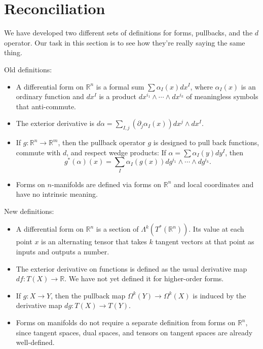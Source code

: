 \documentclass[12pt]{amsbook}
\newcommand{\R}{{\mathbb R}}
\theoremstyle{definition}
\begin{document}
\section{Reconciliation}

We have developed two different sets of definitions for forms, pullbacks,
and the $d$ operator. Our task in this section is to see how they're really
saying the same thing. 

\bigskip

\centerline{Old definitions:}

\smallskip

\begin{itemize}
\item A differential form on $\R^n$ is a formal sum $\sum \alpha_I(x) dx^I$,
where $\alpha_I(x)$ is an ordinary function and $dx^I$ is a product
$dx^{i_1}\wedge \cdots\wedge dx^{i_k}$ of meaningless symbols that
anti-commute.
\item The exterior derivative is 
$d\alpha = \sum_{I,j} (\partial_j \alpha_I(x)) dx^j \wedge dx^I$.
\item If $g: \R^n \to \R^m$, then the pullback operator $g$ is designed
to pull back functions, commute with $d$, and respect wedge products:
If $\alpha = \sum \alpha_I(y) dy^I$, then 
$$ g^*(\alpha)(x) = \sum_I \alpha_I(g(x)) dg^{i_1}\wedge\cdots\wedge dg^{i_k}.
$$
\item Forms on $n$-manifolds are defined via forms on $\R^n$ and local
coordinates and have no intrinsic meaning. 
\end{itemize}

\bigskip

\centerline{New definitions:}

\smallskip

\begin{itemize}
\item A differential form on $\R^n$ is a section of $\Lambda^k(T^*(\R^n))$. 
Its value at each point $x$ is an alternating tensor that takes $k$ 
tangent vectors at that point as inputs and outputs a number. 
\item The exterior derivative on functions is defined as the usual derivative
map $df: T(X) \to \R$. We have not yet defined it for higher-order forms.
\item If $g: X \to Y$, then the pullback map $\Omega^k(Y) \to
  \Omega^k(X)$ is induced by the derivative map $dg: T(X) \to T(Y)$.
\item Forms on manifolds do not require a separate definition from forms
on $\R^n$, since 
tangent spaces, dual spaces, and tensors on tangent spaces are already
well-defined.
\end{itemize}
\end{document}
